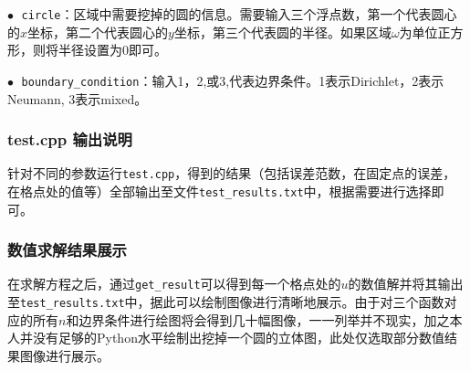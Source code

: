 \documentclass{ctexart}
\begin{document}
\begin{sloppypar}
$\bullet \;$ \verb|circle|：区域中需要挖掉的圆的信息。需要输入三个浮点数，第一个代表圆心的$x$坐标，第二个代表圆心的$y$坐标，第三个代表圆的半径。如果区域$\omega$为单位正方形，则将半径设置为0即可。

$\bullet \;$ \verb|boundary_condition|：输入1，2,或3,代表边界条件。1表示Dirichlet，2表示Neumann, 3表示mixed。

\subsubsection{test.cpp 输出说明}
针对不同的参数运行\verb|test.cpp|，得到的结果（包括误差范数，在固定点的误差，在格点处的值等）全部输出至文件\verb|test_results.txt|中，根据需要进行选择即可。

\subsubsection{数值求解结果展示}
在求解方程之后，通过\verb|get_result|可以得到每一个格点处的$u$的数值解并将其输出至\verb|test_results.txt|中，据此可以绘制图像进行清晰地展示。由于对三个函数对应的所有$n$和边界条件进行绘图将会得到几十幅图像，一一列举并不现实，加之本人并没有足够的Python水平绘制出挖掉一个圆的立体图，此处仅选取部分数值结果图像进行展示。


\end{sloppypar}
\end{document}
